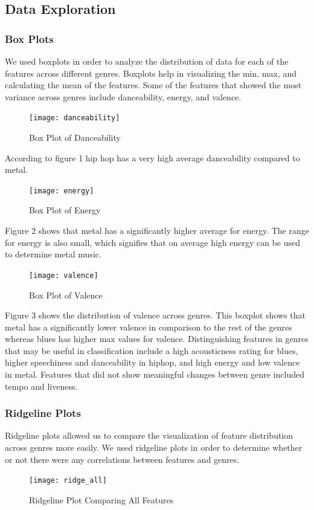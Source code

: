\documentclass[11pt, a4paper, twocolumn]{article}
\begin{document}
\subsection{Data Exploration}
\subsubsection{Box Plots}
We used boxplots in order to analyze the distribution of data for each of the features across different genres. Boxplots help in visualizing the min, max, and calculating the mean of the features. Some of the features that showed the most variance across genres include danceability, energy, and valence.  
\begin{figure}[h!]
\texttt{[image: danceability]}
\caption{Box Plot of Danceability}
\end{figure}
According to figure 1 hip hop has a very high average danceability compared to metal. 
\begin{figure}[h!]
\texttt{[image: energy]}
\caption{Box Plot of Energy}
\end{figure}

Figure 2 shows that metal has a significantly higher average for energy. The range for energy is also small, which signifies that on average high energy can be used to determine metal music.
\begin{figure}[h!]
\texttt{[image: valence]}
\caption{Box Plot of Valence}
\end{figure}

Figure 3 shows the distribution of valence across genres. This boxplot shows that metal has a significantly lower valence in comparison to the rest of the genres whereas blues has higher max values for valence. 
Distinguishing features in genres that may be useful in classification include a high acousticness rating for blues, higher speechiness and danceability in hiphop, and high energy and low valence in metal. Features that did not show meaningful changes between genre included tempo and liveness.  

\subsubsection{Ridgeline Plots}
Ridgeline plots allowed us to compare the visualization of feature distribution across genres more easily. We used ridgeline plots in order to determine whether or not there were any correlations between features and genres. 
\begin{figure}[h!]
\texttt{[image: ridge\_all]}
\caption{Ridgeline Plot Comparing All Features}
\end{figure}
\end{document}
